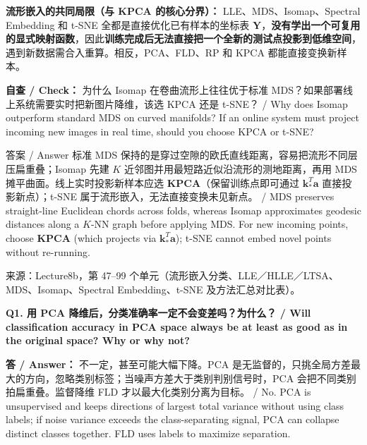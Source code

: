 
\textbf{流形嵌入的共同局限（与 KPCA 的核心分界）：} LLE、MDS、Isomap、Spectral Embedding 和 t-SNE 全都是直接优化已有样本的坐标表 $\mathbf{Y}$，\textbf{没有学出一个可复用的显式映射函数}，因此\textbf{训练完成后无法直接把一个全新的测试点投影到低维空间}，遇到新数据需合入重算。相反，PCA、FLD、RP 和 KPCA 都能直接变换新样本。

\textbf{自查 / Check：} 为什么 Isomap 在卷曲流形上往往优于标准 MDS？如果部署线上系统需要实时把新图片降维，该选 KPCA 还是 t-SNE？ / Why does Isomap outperform standard MDS on curved manifolds? If an online system must project incoming new images in real time, should you choose KPCA or t-SNE?

\begin{StudySolution}{答案 / Answer}
标准 MDS 保持的是穿过空隙的欧氏直线距离，容易把流形不同层压扁重叠；Isomap 先建 $K$ 近邻图并用最短路近似沿流形的测地距离，再用 MDS 摊平曲面。线上实时投影新样本应选 \textbf{KPCA}（保留训练点即可通过 $\mathbf{k}_*^T\mathbf{a}$ 直接投影新点）；t-SNE 属于流形嵌入，无法直接变换未见新点。 / MDS preserves straight-line Euclidean chords across folds, whereas Isomap approximates geodesic distances along a $K$-NN graph before applying MDS. For new incoming points, choose \textbf{KPCA} (which projects via $\mathbf{k}_*^T\mathbf{a}$); t-SNE cannot embed novel points without re-running.
\end{StudySolution}

来源：Lecture8b，第 47–99 个单元（流形嵌入分类、LLE／HLLE／LTSA、MDS、Isomap、Spectral Embedding、t-SNE 及方法汇总对比表）。



\textbf{Q1. 用 PCA 降维后，分类准确率一定不会变差吗？为什么？ / Will classification accuracy in PCA space always be at least as good as in the original space? Why or why not?}

\textbf{答 / Answer：} 不一定，甚至可能大幅下降。PCA 是无监督的，只挑全局方差最大的方向，忽略类别标签；当噪声方差大于类别判别信号时，PCA 会把不同类别拍扁重叠。监督降维 FLD 才以最大化类别分离为目标。 / No. PCA is unsupervised and keeps directions of largest total variance without using class labels; if noise variance exceeds the class-separating signal, PCA can collapse distinct classes together. FLD uses labels to maximize separation.

